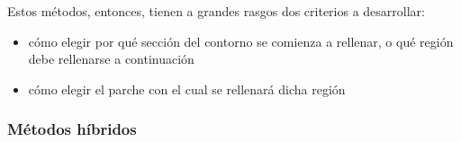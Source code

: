 \documentclass[assd_tpf_main.tex]{subfiles}
\begin{document}
Estos m\'etodos, entonces, tienen a grandes rasgos dos criterios a desarrollar:
\begin{itemize}
	\item c\'omo elegir por qu\'e secci\'on del contorno se comienza a rellenar, o qu\'e
	regi\'on debe rellenarse a continuaci\'on
	\item c\'omo elegir el parche con el cual se rellenar\'a dicha regi\'on
\end{itemize}




\subsubsection{M\'etodos h\'ibridos}
\end{document}
